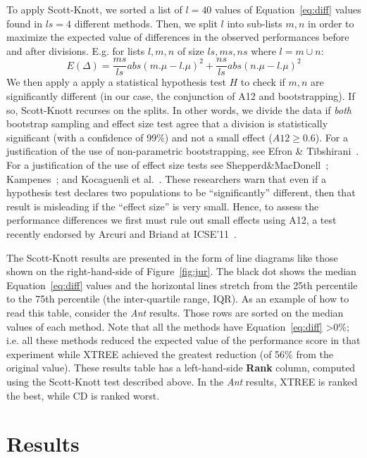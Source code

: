 \documentclass[twocolumn,5p]{elsarticle}
\newcommand{\fig}[1]{Figure~\ref{fig:#1}}
\newcommand{\eq}[1]{Equation~\ref{eq:#1}}
\theoremstyle{break}
\begin{document}
\begin{itemize}
To  apply Scott-Knott,
  we
sorted a list of  $l=40$ values of \eq{diff} values found in  $ls=4$ different methods. 
Then, we split $l$ into sub-lists $m,n$ in order to maximize the expected value of differences in the observed performances before and after divisions. E.g. for lists $l,m,n$ of size $ls,ms,ns$ where $l=m\cup n$: \[E(\Delta)=\frac{ms}{ls}abs(m.\mu - l.\mu)^2 + \frac{ns}{ls}abs(n.\mu - l.\mu)^2\]
We then apply a apply a statistical hypothesis test $H$ to check
if $m,n$ are significantly different  (in our case, the conjunction of A12 and bootstrapping). If so, Scott-Knott recurses on the splits. In other words, we divide the data if \textit{both} bootstrap sampling and effect size test agree that a division is statistically significant (with a confidence of 99\%) and not a small effect ($A12 \ge 0.6$).
For a justification of the use of non-parametric bootstrapping, see Efron \& Tibshirani~\cite[p220-223]{efron93}. For a justification of the use of effect size tests see Shepperd\&MacDonell~\cite{shepperd12a}; Kampenes~\cite{kampenes07}; and Kocaguenli et al.~\cite{Kocaguneli2013:ep}. These researchers warn that even if a hypothesis test declares two populations to be ``significantly'' different, then that result is misleading if the ``effect size'' is very small. Hence, to assess the performance differences we first must rule out small effects using A12, a test   recently endorsed by Arcuri and Briand at ICSE'11~\cite{arcuri11}.

The Scott-Knott  results are presented in the form of line diagrams like those shown on the right-hand-side of \fig{jur}.
The black dot shows the median \eq{diff} values and the horizontal lines stretch 
from the 25th percentile to the 75th percentile (the inter-quartile range, IQR).
As an example of how to read this table, consider the {\em Ant}
results. Those rows are  sorted on the median values of each method. Note that all the methods have \eq{diff} \textgreater $ 0\%$; i.e. all these methods reduced the expected value of the performance score in that experiment while XTREE achieved the greatest reduction (of 56\% from the original value).
These results table has a  left-hand-side  {\bf Rank} column, computed using the
Scott-Knott test described above. In the {\em Ant}
results, XTREE is ranked the best, while CD is  ranked   worst.


\section{Results}
 

\end{itemize}
\end{document}
